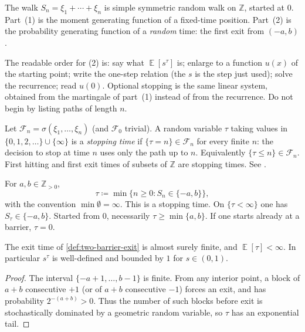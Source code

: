 \documentclass[11pt,a4paper]{article}
\DeclareMathOperator{\E}{\mathbb{E}}
\begin{document}
The walk \( S_n=\xi_1+\cdots+\xi_n \) is simple symmetric random walk on \( \mathbb{Z} \), started at \( 0 \). Part~(1) is the moment generating function of a fixed-time position. Part~(2) is the probability generating function of a \emph{random} time: the first exit from \( (-a,b) \).

The readable order for (2) is: say what \( \E[s^{\tau}] \) is; enlarge to a function \( u(x) \) of the starting point; write the one-step relation (the \( s \) is the step just used); solve the recurrence; read \( u(0) \). Optional stopping is the same linear system, obtained from the martingale of part~(1) instead of from the recurrence. Do not begin by listing paths of length \( n \).

\begin{definition}
\label{def:stopping-time-discrete}
Let \( \mathcal{F}_n=\sigma(\xi_1,\dots,\xi_n) \) (and \( \mathcal{F}_0 \) trivial). A random variable \( \tau \) taking values in \( \{0,1,2,\dots\}\cup\{\infty\} \) is a \emph{stopping time} if \( \{\tau=n\}\in\mathcal{F}_n \) for every finite \( n \): the decision to stop at time \( n \) uses only the path up to \( n \). Equivalently \( \{\tau\le n\}\in\mathcal{F}_n \). First hitting and first exit times of subsets of \( \mathbb{Z} \) are stopping times. See \citep[\S5.2]{durrett2010}.
\end{definition}

\begin{definition}
\label{def:two-barrier-exit}
For \( a,b\in\mathbb{Z}_{>0} \),
\[
\tau
\coloneqq
\min\{n\ge 0: S_n\in\{-a,b\}\},
\]
with the convention \( \min\emptyset=\infty \). This is a stopping time. On \( \{\tau<\infty\} \) one has \( S_{\tau}\in\{-a,b\} \). Started from \( 0 \), necessarily \( \tau\ge\min\{a,b\} \). If one starts already at a barrier, \( \tau=0 \).
\end{definition}

\begin{lemma}
\label{lem:tau-finite}
The exit time of \cref{def:two-barrier-exit} is almost surely finite, and \( \E[\tau]<\infty \). In particular \( s^{\tau} \) is well-defined and bounded by \( 1 \) for \( s\in(0,1) \).
\end{lemma}

\begin{proof}
The interval \( \{-a+1,\dots,b-1\} \) is finite. From any interior point, a block of \( a+b \) consecutive \( +1 \) (or of \( a+b \) consecutive \( -1 \)) forces an exit, and has probability \( 2^{-(a+b)}>0 \). Thus the number of such blocks before exit is stochastically dominated by a geometric random variable, so \( \tau \) has an exponential tail.
\end{proof}
\end{document}

